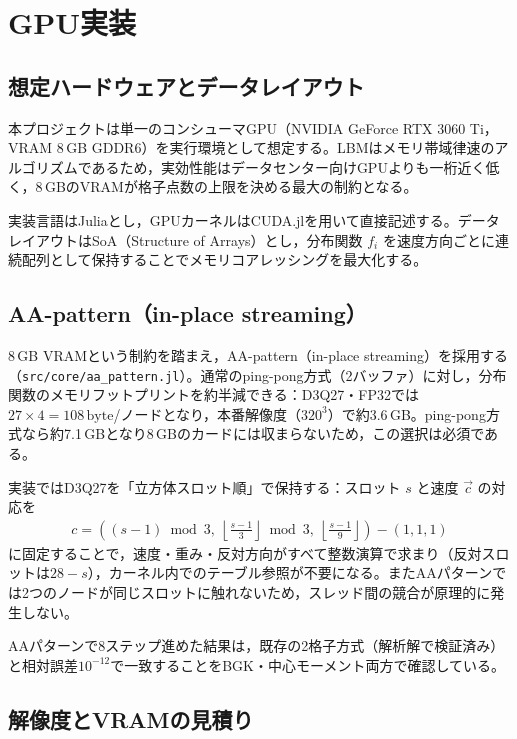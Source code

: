 \section{GPU実装}
\label{sec:gpu}

\subsection{想定ハードウェアとデータレイアウト}

本プロジェクトは単一のコンシューマGPU（NVIDIA GeForce RTX 3060 Ti，VRAM 8\,GB GDDR6）を実行環境として想定する。LBMはメモリ帯域律速のアルゴリズムであるため，実効性能はデータセンター向けGPUよりも一桁近く低く，8\,GBのVRAMが格子点数の上限を決める最大の制約となる。

実装言語はJuliaとし，GPUカーネルはCUDA.jlを用いて直接記述する。データレイアウトはSoA（Structure of Arrays）とし，分布関数 \(f_i\) を速度方向ごとに連続配列として保持することでメモリコアレッシングを最大化する。

\subsection{AA-pattern（in-place streaming）}

8\,GB VRAMという制約を踏まえ，AA-pattern（in-place streaming）を採用する（\texttt{src/core/aa\_pattern.jl}）。通常のping-pong方式（2バッファ）に対し，分布関数のメモリフットプリントを約半減できる：D3Q27・FP32では\(27\times4=108\,\text{byte}\)/ノードとなり，本番解像度（\(320^3\)）で約3.6\,GB。ping-pong方式なら約7.1\,GBとなり8\,GBのカードには収まらないため，この選択は必須である。

実装ではD3Q27を「立方体スロット順」で保持する：スロット \(s\) と速度 \(\vec c\) の対応を
\begin{align}
	c = \left((s-1)\bmod3,\ \left\lfloor\frac{s-1}{3}\right\rfloor\bmod3,\ \left\lfloor\frac{s-1}{9}\right\rfloor\right) - (1,1,1)
	\label{eq:cube-slot}
\end{align}
に固定することで，速度・重み・反対方向がすべて整数演算で求まり（反対スロットは\(28-s\)），カーネル内でのテーブル参照が不要になる。またAAパターンでは2つのノードが同じスロットに触れないため，スレッド間の競合が原理的に発生しない。

AAパターンで8ステップ進めた結果は，既存の2格子方式（解析解で検証済み）と相対誤差\(10^{-12}\)で一致することをBGK・中心モーメント両方で確認している。

\subsection{解像度とVRAMの見積り}
\label{sec:resolution-budget}

